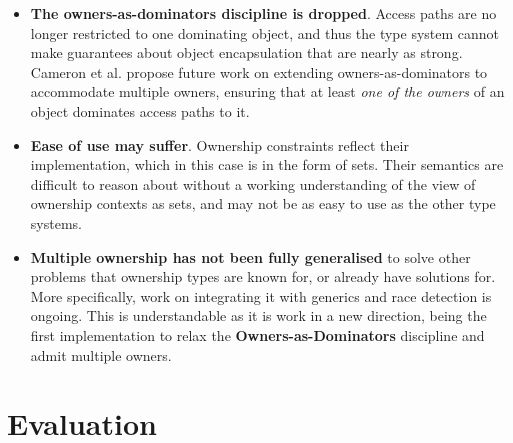 \documentclass{acm_proc_article-sp}
\begin{document}
\begin{itemize}

	\item \textbf{The owners-as-dominators discipline is dropped}. Access paths
		are no longer restricted to one dominating object, and thus the type
		system cannot make guarantees about object encapsulation that are nearly
		as strong. Cameron et al. propose future work on extending
		owners-as-dominators to accommodate multiple owners, ensuring that at
		least \textit{one of the owners} of an object dominates access paths to
		it.

    \item \textbf{Ease of use may suffer}. Ownership constraints reflect their
        implementation, which in this case is in the form of sets. Their
        semantics are difficult to reason about without a working understanding
        of the view of ownership contexts as sets, and may not be as easy to use
        as the other type systems.

	\item \textbf{Multiple ownership has not been fully generalised} to solve
		other problems that ownership types are known for, or already have
		solutions for. More specifically, work on integrating it with generics
		and race detection is ongoing. This is understandable as it is work in
		a new direction, being the first implementation to relax the
		\textbf{Owners-as-Dominators} discipline and admit multiple owners.

\end{itemize}

\section{Evaluation}
\label{sec:eval}
\end{document}
